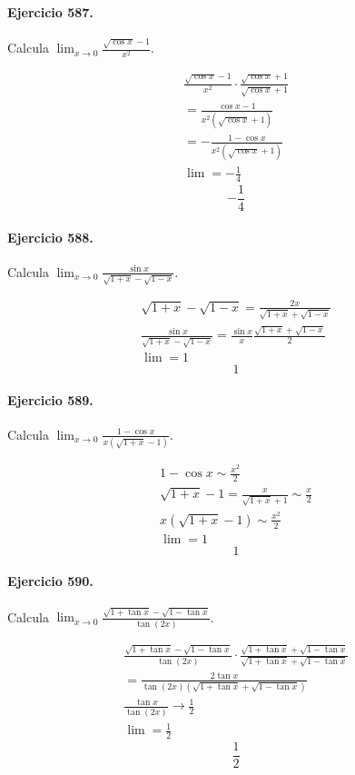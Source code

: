 \documentclass[11pt,a4paper]{article}
\begin{document}
\paragraph{Ejercicio 587.} Calcula $\displaystyle \lim_{x\to0}\frac{\sqrt{\cos x}-1}{x^2}$.

\[
\begin{aligned}
\frac{\sqrt{\cos x}-1}{x^2}\cdot\frac{\sqrt{\cos x}+1}{\sqrt{\cos x}+1}\\
=\frac{\cos x-1}{x^2(\sqrt{\cos x}+1)}\\
=-\frac{1-\cos x}{x^2(\sqrt{\cos x}+1)}\\
\lim=-\frac14
\end{aligned}
\]
\[\boxed{-\frac14}\]


\paragraph{Ejercicio 588.} Calcula $\displaystyle \lim_{x\to0}\frac{\sin x}{\sqrt{1+x}-\sqrt{1-x}}$.

\[
\begin{aligned}
\sqrt{1+x}-\sqrt{1-x}=\frac{2x}{\sqrt{1+x}+\sqrt{1-x}}\\
\frac{\sin x}{\sqrt{1+x}-\sqrt{1-x}}=\frac{\sin x}{x}\frac{\sqrt{1+x}+\sqrt{1-x}}{2}\\
\lim=1
\end{aligned}
\]
\[\boxed{1}\]


\paragraph{Ejercicio 589.} Calcula $\displaystyle \lim_{x\to0}\frac{1-\cos x}{x(\sqrt{1+x}-1)}$.

\[
\begin{aligned}
1-\cos x\sim\frac{x^2}{2}\\
\sqrt{1+x}-1=\frac{x}{\sqrt{1+x}+1}\sim\frac{x}{2}\\
x(\sqrt{1+x}-1)\sim\frac{x^2}{2}\\
\lim=1
\end{aligned}
\]
\[\boxed{1}\]


\paragraph{Ejercicio 590.} Calcula $\displaystyle \lim_{x\to0}\frac{\sqrt{1+\tan x}-\sqrt{1-\tan x}}{\tan(2x)}$.

\[
\begin{aligned}
\frac{\sqrt{1+\tan x}-\sqrt{1-\tan x}}{\tan(2x)}\cdot\frac{\sqrt{1+\tan x}+\sqrt{1-\tan x}}{\sqrt{1+\tan x}+\sqrt{1-\tan x}}\\
=\frac{2\tan x}{\tan(2x)(\sqrt{1+\tan x}+\sqrt{1-\tan x})}\\
\frac{\tan x}{\tan(2x)}\to\frac12\\
\lim=\frac12
\end{aligned}
\]
\[\boxed{\frac12}\]
\end{document}
